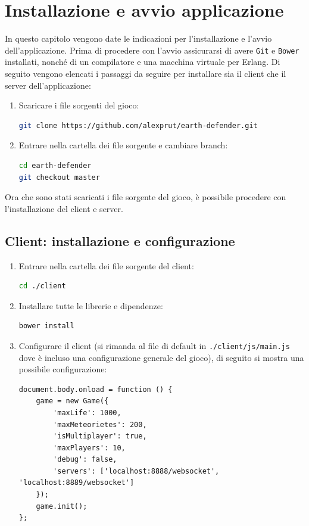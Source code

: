 \documentclass[paper=a4, fontsize=11pt]{scrartcl} %
\numberwithin{equation}{section} %
\numberwithin{figure}{section} %
\numberwithin{table}{section} %
\begin{document}
\section{Installazione e avvio applicazione}
In questo capitolo vengono date le indicazioni per l'installazione e l'avvio dell'applicazione.
Prima di procedere con l'avvio assicurarsi di avere \texttt{Git}\cite{git} e \texttt{Bower}\cite{bower} installati, nonché di un compilatore e una macchina virtuale per Erlang.
Di seguito vengono elencati i passaggi da seguire per installare sia il client che il server dell'applicazione:
\begin{enumerate}  
\item
Scaricare i file sorgenti del gioco:
\begin{lstlisting}[language=bash]
git clone https://github.com/alexprut/earth-defender.git
\end{lstlisting}

\item
Entrare nella cartella dei file sorgente e cambiare branch:
\begin{lstlisting}[language=bash]
cd earth-defender
git checkout master
\end{lstlisting}
\end{enumerate}

Ora che sono stati scaricati i file sorgente del gioco, è possibile procedere con l'installazione del client e server.

\subsection{Client: installazione e configurazione}
\begin{enumerate}  
\item
Entrare nella cartella dei file sorgente del client:
\begin{lstlisting}[language=bash]
cd ./client
\end{lstlisting}

\item
Installare tutte le librerie e dipendenze:
\begin{lstlisting}[language=bash]
bower install
\end{lstlisting}

\item
Configurare il client (si rimanda al file di default in \texttt{./client/js/main.js} dove è incluso una configurazione generale del gioco), di seguito si mostra una possibile configurazione:
\begin{lstlisting}
document.body.onload = function () {
    game = new Game({
        'maxLife': 1000,
        'maxMeteorietes': 200,
        'isMultiplayer': true,
        'maxPlayers': 10,
        'debug': false,
        'servers': ['localhost:8888/websocket', 'localhost:8889/websocket']
    });
    game.init();
};
\end{lstlisting}
\end{enumerate}
\end{document}
